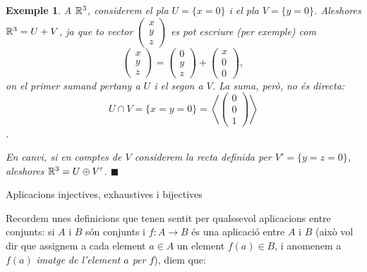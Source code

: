 \documentclass[
  11pt,
]{book}
\makeatletter
\numberwithin{dummy}{section}
\theoremstyle{maincolornumbox}
\theoremstyle{blacknumex}
\newtheorem{exampleT}{Exemple}[chapter]
\theoremstyle{blacknumbox}
\theoremstyle{maincolornum}
\newenvironment{example}{\begin{exampleT}}{\hfill{\tiny\ensuremath{\blacksquare}}\end{exampleT}}
\renewcommand{\section}{\@startsection{section}{1}{\z@}
{-4ex \@plus -1ex \@minus -.4ex}
{1ex \@plus.2ex }
{\normalfont\large\sffamily\bfseries}}
\makeatother
\begin{document}
\begin{example}
A \(\mathbb{R}^3\), considerem el pla \(U=\{x=0\}\) i el pla \(V=\{y = 0 \}\).
Aleshores \(\mathbb{R}^3 = U + V\), ja que to vector
\(\begin{pmatrix}x\\y\\z\end{pmatrix}\) es pot escriure (per exemple) com
\[\begin{pmatrix}
    x\\y\\z
    \end{pmatrix}=
    \begin{pmatrix}
    0\\y\\z
    \end{pmatrix}+
    \begin{pmatrix}
    x\\0\\0
    \end{pmatrix},\] on el primer sumand pertany a \(U\) i el segon a \(V\).
La suma, però, no és directa:
\[U\cap V=\{x=y=0\}=\left\langle \begin{pmatrix}0\\0\\1\end{pmatrix}\right\rangle\].

En canvi, si en comptes de \(V\) considerem la recta definida per
\(V'=\{y=z=0\}\), aleshores \(\mathbb{R}^3=U\oplus V'\).
\end{example}

\hypertarget{aplicacions-injectives-exhaustives-i-bijectives}{%
\section{Aplicacions injectives, exhaustives i bijectives}\label{aplicacions-injectives-exhaustives-i-bijectives}}

Recordem unes definicions que tenen sentit per qualssevol aplicacions
entre conjunts: si \(A\) i \(B\) són conjunts i \(f\colon A \to B\) és una
aplicació entre \(A\) i \(B\) (això vol dir que assignem a cada element
\(a\in A\) un element \(f(a)\in B\), i anomenem a \(f(a)\) \emph{imatge de
l'element \(a\) per \(f\)}), diem que:
\end{document}
